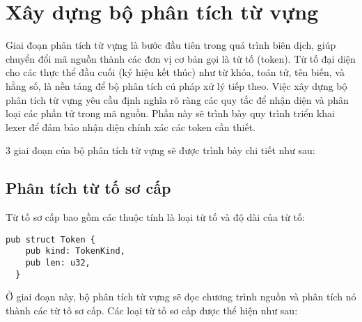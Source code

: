 \section{Xây dựng bộ phân tích từ vựng}
Giai đoạn phân tích từ vựng là bước đầu tiên trong quá trình biên dịch, giúp chuyển đổi mã nguồn thành các đơn vị cơ bản gọi là từ tố (token). Từ tố đại diện cho các thực thể đầu cuối (ký hiệu kết thúc) như từ khóa, toán tử, tên biến, và hằng số, là nền tảng để bộ phân tích cú pháp xử lý tiếp theo. Việc xây dựng bộ phân tích từ vựng yêu cầu định nghĩa rõ ràng các quy tắc để nhận diện và phân loại các phần tử trong mã nguồn. Phần này sẽ trình bày quy trình triển khai lexer để đảm bảo nhận diện chính xác các token cần thiết.

3 giai đoạn của bộ phân tích từ vựng sẽ được trình bày chi tiết như sau:

\subsection{Phân tích từ tố sơ cấp}
Từ tố sơ cấp bao gồm các thuộc tính là loại từ tố và độ dài của từ tố:

\clearpage
\begin{lstlisting}[]
  pub struct Token {
    pub kind: TokenKind,
    pub len: u32,
  }
\end{lstlisting}

Ở giai đoạn này, bộ phân tích từ vựng sẽ đọc chương trình nguồn và phân tích nó thành các từ tố sơ cấp. Các loại từ tố sơ cấp được thể hiện như sau:

